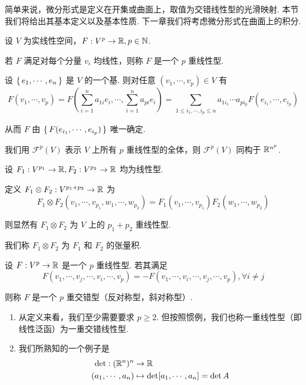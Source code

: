 简单来说，微分形式是定义在开集或曲面上，取值为交错线性型的光滑映射.
本节我们将给出其基本定义以及基本性质. 下一章我们将考虑微分形式在曲面上的积分.



\begin{definition}
    设 $V$ 为实线性空间，$F:V^p\to\mathbb{R},p\in\mathbb{N}$.
    
    若 $F$ 满足对每个分量 $v_i$ 均线性，则称 $F$ 是一个 $p$ 重线性型.
\end{definition}

设 $\set{e_1,\cdots,e_n}$ 是 $V$ 的一个基. 则对任意 $(v_1,\cdots,v_p)\in V$ 有
$$
F(v_1,\cdots,v_p)=F\left(\sum_{i=1}^na_{1i}e_i,\cdots,\sum_{i=1}^na_{pi}e_i\right)=\sum_{1\le i_1,\cdots,i_p\le n}a_{1i_1}\cdots a_{pi_p}F(e_{i_1},\cdots,e_{i_p})
$$

从而 $F$ 由 $\set{F(e_{i_1},\cdots,e_{i_p})}$ 唯一确定.

我们用 $\mathscr{F}^p(V)$ 表示 $V$ 上所有 $p$ 重线性型的全体，则 $\mathscr{F}^p(V)$ 同构于 $\mathbb{R}^{n^p}$.

\begin{definition}
    设 $F_1:V^{p_1}\to\mathbb{R},F_2:V^{p_2}\to\mathbb{R}$ 均为线性型.

    定义 $F_1\otimes F_2:V^{p_1+p_2}\to\mathbb{R}$ 为
$$
F_1\otimes F_2(v_1,\cdots,v_{p_1},w_1,\cdots,w_{p_2})=F_1(v_1,\cdots,v_{p_1})F_2(w_1,\cdots,w_{p_2})
$$

    则显然有 $F_1\otimes F_2$ 为 $V$ 上的 $p_1+p_2$ 重线性型.

    我们称 $F_1\otimes F_2$ 为 $F_1$ 和 $F_2$ 的张量积.
\end{definition}


\begin{definition}
    设 $F:V^p\to\mathbb{R}$ 是一个 $p$ 重线性型. 若其满足
$$
F(v_1,\cdots,v_j,\cdots,v_i,\cdots,v_p)=-F(v_1,\cdots,v_i,\cdots,v_j,\cdots,v_p),\forall i\ne j
$$

    则称 $F$ 是一个 $p$ 重交错型（反对称型，斜对称型）.
\end{definition}

\begin{hint}
    \begin{enumerate}
        \item 从定义来看，我们至少需要要求 $p\ge 2$. 但按照惯例，我们也称一重线性型（即线性泛函）为一重交错线性型.
        
        \item 我们所熟知的一个例子是
$$
\begin{aligned}
    \det:(\mathbb{R}^n)^n&\to\mathbb{R}\\
    (a_1,\cdots,a_n)&\mapsto\det[a_1,\cdots,a_n]=\det A
\end{aligned}
$$
    \end{enumerate}
\end{hint}


